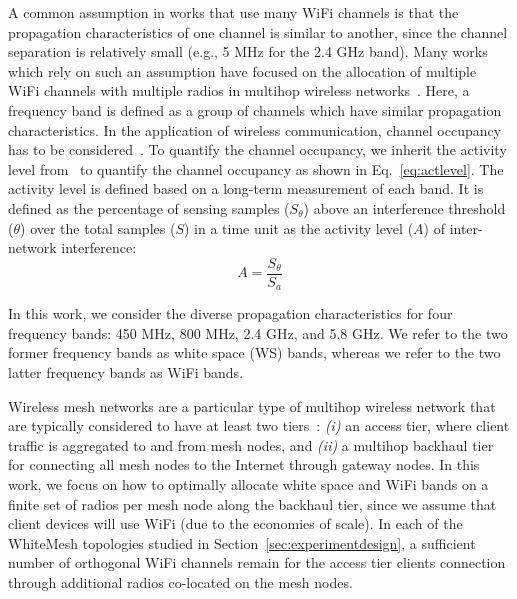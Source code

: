 A common assumption in works that use many WiFi channels is that the
propagation characteristics of one channel is similar to another, 
since the channel separation is relatively small (e.g., 5 MHz for 
the 2.4 GHz band).
Many works which rely on such an assumption have focused on the 
allocation of multiple WiFi channels with multiple radios in 
multihop wireless networks~\cite{si2010overview}.  Here, a frequency 
band is defined as a group of channels which have
similar propagation characteristics.
In the application of wireless communication, channel occupancy has
to be considered~\cite{fallah2010congestion}. To quantify the 
channel occupancy, we inherit the activity level from~\cite{cuileveraging}
to quantify the channel occupancy as shown in Eq.~\ref{eq:actlevel}.
The activity level is defined based on a long-term measurement 
of each band.  It is defined as the percentage of sensing samples ($S_\theta$) above an 
interference threshold ($\theta$) over the total samples ($S$) in a time unit as the 
activity level ($A$) of inter-network interference:
\begin{equation}
\label{eq:actlevel}
A=\frac{S_\theta}{S_a}
\end{equation}

In this work, we consider the diverse propagation characteristics
for four frequency bands: 450 MHz, 800 MHz, 2.4 GHz, and 5.8 GHz.
We refer to the two former frequency bands as white space (WS) bands, whereas
we refer to the two latter frequency bands as WiFi bands.

Wireless mesh networks are a particular type of multihop wireless network
that are typically considered to have at least two
tiers~\cite{CRSK06}: {\it (i)} an access tier, where client traffic 
is aggregated to and from mesh nodes, and {\it (ii)} a multihop 
backhaul tier for connecting all mesh nodes to the Internet through 
gateway nodes. In this work, we focus on how to optimally allocate 
white space and WiFi bands on a finite set of radios per mesh node
along the backhaul tier, since we assume that client devices will use 
WiFi (due to the economies of scale).  In each of the WhiteMesh 
topologies studied in Section~\ref{sec:experimentdesign}, a sufficient 
number of orthogonal WiFi channels remain for the access tier 
clients connection through additional radios co-located on the mesh nodes.

